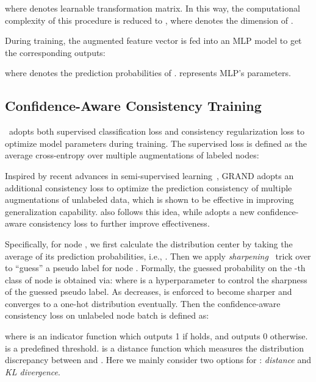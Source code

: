 where  denotes learnable transformation matrix. In this way, the computational complexity of this procedure is reduced to , where  denotes the dimension of . 






 During training, the augmented feature vector  is fed into an MLP model to get the corresponding outputs:

where  denotes the prediction probabilities of .  represents MLP's parameters. 












\subsection{Confidence-Aware Consistency Training}
\model\ adopts both supervised classification loss and consistency regularization loss to optimize model parameters during training. The supervised loss is defined as the average cross-entropy over multiple augmentations of labeled nodes:


Inspired by recent advances in semi-supervised learning~\cite{berthelot2019mixmatch}, GRAND adopts an additional consistency loss to optimize the prediction consistency of multiple augmentations of unlabeled data, which is shown to be effective in improving generalization capability. \model also follows this idea, while adopts a new confidence-aware consistency loss to further improve effectiveness. 

Specifically, for node , we first calculate the distribution center by taking the average of its  prediction probabilities, i.e., . Then we apply \textit{sharpening}~\cite{sohn2020fixmatch} trick over  to ``guess'' a pseudo label  for node . Formally, the guessed probability on the -th class of node  is obtained via:
where  is a hyperparameter to control the sharpness of the guessed pseudo label.  As  decreases,  is enforced to become sharper and converges to a one-hot distribution eventually. 
Then the confidence-aware consistency loss on unlabeled node batch  is defined as: 
 
where  is an indicator function which outputs 1 if  holds, and outputs 0 otherwise.  is a predefined threshold.  is a distance function which measures the distribution discrepancy between  and . Here we mainly consider two options for : \textit{ distance} and \textit{KL divergence}.

